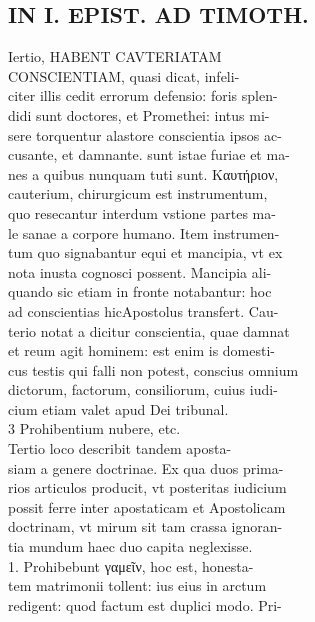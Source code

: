 \documentclass{article}
\begin{document}
\begin{pages}
\section*{IN I. EPIST. AD TIMOTH. \\
                }
Iertio, HABENT CAVTERIATAM \\
                CONSCIENTIAM, quasi dicat, infeli- \\
                citer illis cedit errorum defensio: foris splen- \\
                didi sunt doctores, et Promethei: intus mi- \\
                sere torquentur alastore conscientia ipsos ac- \\
                cusante, et damnante. sunt istae furiae et ma- \\
                nes a quibus nunquam tuti sunt. Καυτήριον, \\
                cauterium, chirurgicum est instrumentum, \\
                quo resecantur interdum vstione partes ma- \\
                le sanae a corpore humano. Item instrumen- \\
                tum quo signabantur equi et mancipia, vt ex \\
                nota inusta cognosci possent. Mancipia ali- \\
                quando sic etiam in fronte notabantur: hoc \\
                ad conscientias hicApostolus transfert. Cau- \\
                terio notat a dicitur conscientia, quae damnat \\
                et reum agit hominem: est enim is domesti- \\
                cus testis qui falli non potest, conscius omnium \\
                dictorum, factorum, consiliorum, cuius iudi- \\
                cium etiam valet apud Dei tribunal. \\
                3 Prohibentium nubere, etc. \\
                Tertio loco describit tandem aposta- \\
                siam a genere doctrinae. Ex qua duos prima- \\
                rios articulos producit, vt posteritas iudicium \\
                possit ferre inter apostaticam et Apostolicam \\
                doctrinam, vt mirum sit tam crassa ignoran- \\
                tia mundum haec duo capita neglexisse. \\
                1. Prohibebunt γαμεῖν, hoc est, honesta- \\
                tem matrimonii tollent: ius eius in arctum \\
                redigent: quod factum est duplici modo. Pri- \\
                

\end{pages}
\end{document}
